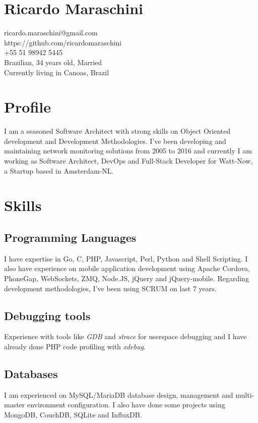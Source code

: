 \documentclass{article}
\begin{document}
\begin{multicols}{2}

\section{Ricardo Maraschini}
ricardo.maraschini@gmail.com\\
https://github.com/ricardomaraschini\\
+55 51 98942 5445\\
Brazilian, 34 years old, Married\\
Currently living in Canoas, Brazil\\

\section{Profile}
I am a seasoned Software Architect with strong skills on Object Oriented
development and Development Methodologies. I've been developing and maintaining
network monitoring solutions from 2005 to 2016 and currently I am working as 
Software Architect, DevOps and Full-Stack Developer for Watt-Now, a Startup
based in Amsterdam-NL.

\section{Skills}
\subsection{Programming Languages}
I have expertise in Go, C, PHP, Javascript, Perl, Python and Shell Scripting. 
I also have experience on mobile application development using Apache Cordova, PhoneGap, 
WebSockets, ZMQ, Node.JS, jQuery and jQuery-mobile. Regarding development methodologies,
I've been using SCRUM on last 7 years.

\subsection{Debugging tools}
Experience with tools like \textit{GDB} and \textit{strace} for userspace 
debugging and I have already done PHP code profiling with \textit{xdebug}.

\subsection{Databases}
I am experienced on MySQL/MariaDB database design, management and multi-master
environment configuration. I also have done some projects using MongoDB, CouchDB,
SQLite and InfluxDB.


\end{multicols}
\end{document}
